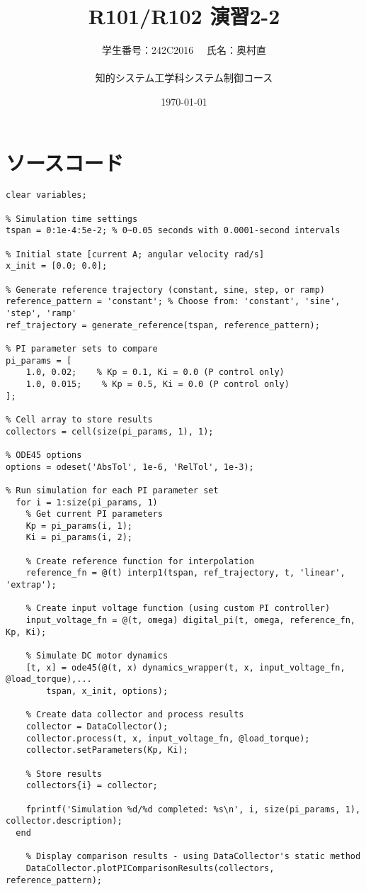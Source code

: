 \documentclass[10pt,a4paper,titlepage]{jreport} %
\title{R101/R102 演習2-2} %
\author{
  学生番号：242C2016 　氏名：奥村直 \\
  \\
  知的システム工学科システム制御コース
  } %
\date{\today} %
\begin{document}
\maketitle
\chapter{ソースコード}
\begin{lstlisting}[caption=exercise2-1]
  %% PI Parameter Comparison Simulation
clear variables;

% Simulation time settings
tspan = 0:1e-4:5e-2; % 0~0.05 seconds with 0.0001-second intervals

% Initial state [current A; angular velocity rad/s]
x_init = [0.0; 0.0];

% Generate reference trajectory (constant, sine, step, or ramp)
reference_pattern = 'constant'; % Choose from: 'constant', 'sine', 'step', 'ramp'
ref_trajectory = generate_reference(tspan, reference_pattern);

% PI parameter sets to compare
pi_params = [
    1.0, 0.02;    % Kp = 0.1, Ki = 0.0 (P control only)
    1.0, 0.015;    % Kp = 0.5, Ki = 0.0 (P control only)
];

% Cell array to store results
collectors = cell(size(pi_params, 1), 1);

% ODE45 options
options = odeset('AbsTol', 1e-6, 'RelTol', 1e-3);

% Run simulation for each PI parameter set
  for i = 1:size(pi_params, 1)
    % Get current PI parameters
    Kp = pi_params(i, 1);
    Ki = pi_params(i, 2);
    
    % Create reference function for interpolation
    reference_fn = @(t) interp1(tspan, ref_trajectory, t, 'linear', 'extrap');
    
    % Create input voltage function (using custom PI controller)
    input_voltage_fn = @(t, omega) digital_pi(t, omega, reference_fn, Kp, Ki);
    
    % Simulate DC motor dynamics
    [t, x] = ode45(@(t, x) dynamics_wrapper(t, x, input_voltage_fn, @load_torque),...
        tspan, x_init, options);
    
    % Create data collector and process results
    collector = DataCollector();
    collector.process(t, x, input_voltage_fn, @load_torque);
    collector.setParameters(Kp, Ki);
    
    % Store results
    collectors{i} = collector;
    
    fprintf('Simulation %d/%d completed: %s\n', i, size(pi_params, 1), collector.description);
  end

    % Display comparison results - using DataCollector's static method
    DataCollector.plotPIComparisonResults(collectors, reference_pattern);
\end{lstlisting}
\end{document}
